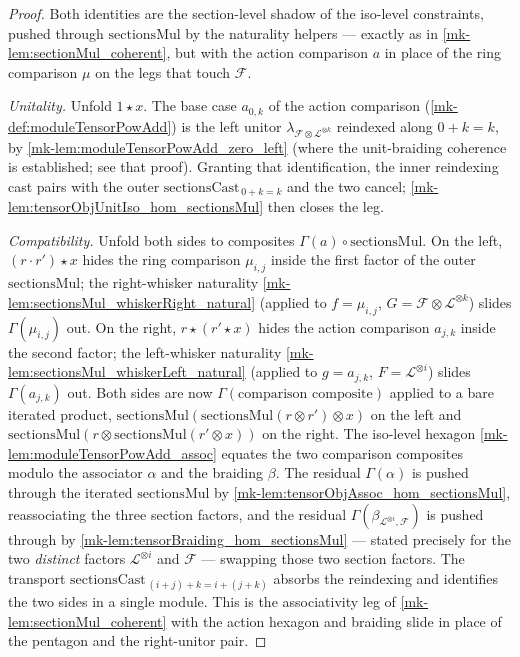 \begin{proof}
  Both identities are the section-level shadow of the iso-level constraints, pushed
  through \(\mathrm{sectionsMul}\) by the naturality helpers --- exactly as in
  \ref{mk-lem:sectionMul_coherent}, but with the action comparison \(a\) in place of
  the ring comparison \(\mu\) on the legs that touch \(\mathcal{F}\).

  \emph{Unitality.} Unfold \(1\star x\). The base case \(a_{0,k}\) of the action
  comparison (\ref{mk-def:moduleTensorPowAdd}) is the left unitor
  \(\lambda_{\mathcal{F}\otimes\mathcal{L}^{\otimes k}}\) reindexed along \(0+k=k\),
  by \ref{mk-lem:moduleTensorPowAdd_zero_left} (where the unit-braiding coherence is
  established; see that proof). Granting that identification, the inner
  reindexing cast pairs with the outer \(\mathrm{sectionsCast}_{\,0+k=k}\) and the two
  cancel; \ref{mk-lem:tensorObjUnitIso_hom_sectionsMul} then closes the leg.

  \emph{Compatibility.} Unfold both sides to composites
  \(\Gamma(a)\circ\mathrm{sectionsMul}\). On the left, \((r\cdot r')\star x\) hides
  the ring comparison \(\mu_{i,j}\) inside the first factor of the outer
  \(\mathrm{sectionsMul}\); the right-whisker naturality
  \ref{mk-lem:sectionsMul_whiskerRight_natural} (applied to \(f=\mu_{i,j}\),
  \(G=\mathcal{F}\otimes\mathcal{L}^{\otimes k}\)) slides \(\Gamma(\mu_{i,j})\) out.
  On the right, \(r\star(r'\star x)\) hides the action comparison \(a_{j,k}\) inside
  the second factor; the left-whisker naturality
  \ref{mk-lem:sectionsMul_whiskerLeft_natural} (applied to \(g=a_{j,k}\),
  \(F=\mathcal{L}^{\otimes i}\)) slides \(\Gamma(a_{j,k})\) out. Both sides are now
  \(\Gamma(\text{comparison composite})\) applied to a bare iterated product,
  \(\mathrm{sectionsMul}(\mathrm{sectionsMul}(r\otimes r')\otimes x)\) on the left and
  \(\mathrm{sectionsMul}(r\otimes\mathrm{sectionsMul}(r'\otimes x))\) on the right.
  The iso-level hexagon \ref{mk-lem:moduleTensorPowAdd_assoc} equates the two
  comparison composites modulo the associator \(\alpha\) and the braiding \(\beta\).
  The residual \(\Gamma(\alpha)\) is pushed through the iterated
  \(\mathrm{sectionsMul}\) by \ref{mk-lem:tensorObjAssoc_hom_sectionsMul},
  reassociating the three section factors, and the residual
  \(\Gamma(\beta_{\mathcal{L}^{\otimes i},\mathcal{F}})\) is pushed through by
  \ref{mk-lem:tensorBraiding_hom_sectionsMul} --- stated precisely for the two
  \emph{distinct} factors \(\mathcal{L}^{\otimes i}\) and \(\mathcal{F}\) --- swapping
  those two section factors. The transport
  \(\mathrm{sectionsCast}_{\,(i+j)+k=i+(j+k)}\) absorbs the reindexing and identifies
  the two sides in a single module. This is the associativity leg of
  \ref{mk-lem:sectionMul_coherent} with the action hexagon and braiding slide in place
  of the pentagon and the right-unitor pair.
\end{proof}

